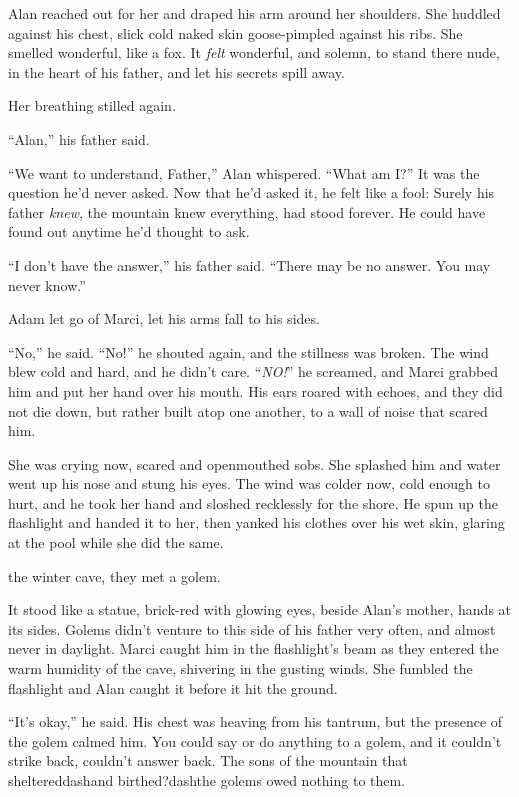 Alan reached out for her and draped his arm around her shoulders.  She
huddled against his chest, slick cold naked skin goose-pimpled against
his ribs.  She smelled wonderful, like a fox.  It \textit{felt}
wonderful, and solemn, to stand there nude, in the heart of his
father, and let his secrets spill away.

Her breathing stilled again.

``Alan,'' his father said.

``We want to understand, Father,'' Alan whispered.  ``What am I?'' It
was the question he'd never asked.  Now that he'd asked it, he felt
like a fool:  Surely his father \textit{knew}, the mountain knew
everything, had stood forever.  He could have found out anytime he'd
thought to ask.

``I don't have the answer,'' his father said.  ``There may be no
answer.  You may never know.''

Adam let go of Marci, let his arms fall to his sides.

``No,'' he said.  ``No!'' he shouted again, and the stillness was
broken.  The wind blew cold and hard, and he didn't care. 
``\textit{NO!}'' he screamed, and Marci grabbed him and put her hand
over his mouth.  His ears roared with echoes, and they did not die
down, but rather built atop one another, to a wall of noise that
scared him.

She was crying now, scared and openmouthed sobs.  She splashed him and
water went up his nose and stung his eyes.  The wind was colder now,
cold enough to hurt, and he took her hand and sloshed recklessly for
the shore.  He spun up the flashlight and handed it to her, then
yanked his clothes over his wet skin, glaring at the pool while she
did the same.

 the winter cave, they met a golem.

It stood like a statue, brick-red with glowing eyes, beside Alan's
mother, hands at its sides.  Golems didn't venture to this side of his
father very often, and almost never in daylight.  Marci caught him in
the flashlight's beam as they entered the warm humidity of the cave,
shivering in the gusting winds.  She fumbled the flashlight and Alan
caught it before it hit the ground.

``It's okay,'' he said.  His chest was heaving from his tantrum, but
the presence of the golem calmed him.  You could say or do anything to
a golem, and it couldn't strike back, couldn't answer back.  The sons
of the mountain that sheltereddash{}and birthed?dash{}the golems owed
nothing to them.

